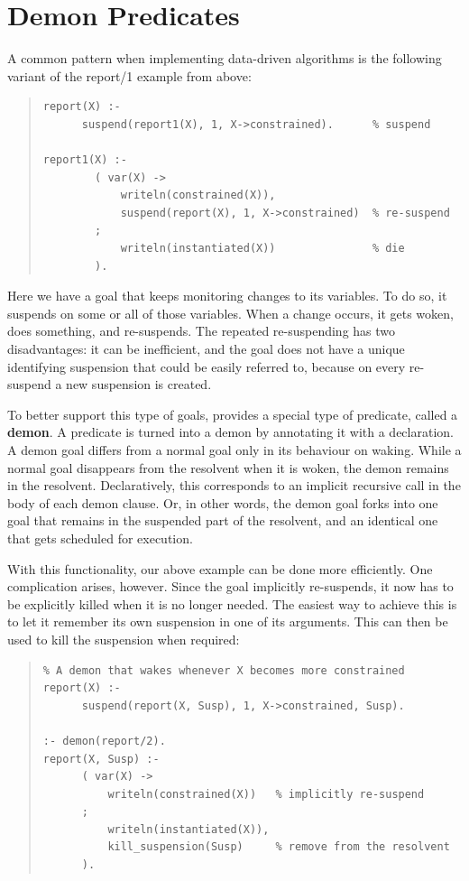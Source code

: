

\section{Demon Predicates}
\label{secdemon}%
A common pattern when implementing data-driven algorithms is the following
variant of the report/1 example from above:
\begin{quote}\begin{verbatim}
report(X) :-
      suspend(report1(X), 1, X->constrained).      % suspend

report1(X) :-
        ( var(X) ->
            writeln(constrained(X)),
            suspend(report(X), 1, X->constrained)  % re-suspend
        ;
            writeln(instantiated(X))               % die
        ).
\end{verbatim}\end{quote}
Here we have a goal that keeps monitoring changes to its variables.
To do so, it suspends on some or all of those variables.
When a change occurs, it gets woken, does something, and re-suspends.
The repeated re-suspending has two disadvantages: it can be inefficient,
and the goal does not have a unique identifying suspension that could be
easily referred to, because on every re-suspend a new suspension is created.

To better support this type of goals, {\eclipse} provides a special type
of predicate, called a {\bf demon}. A predicate is turned into a
demon by annotating it with a
declaration.
A demon goal differs from a normal goal only in its behaviour on
waking. While a normal goal disappears from the resolvent when it is
woken, the demon remains in the resolvent.
Declaratively, this corresponds to an implicit recursive call in
the body of each demon clause.
Or, in other words, the demon goal forks into one goal that remains in the
suspended part of the resolvent, and an identical one
that gets scheduled for execution.

With this functionality, our above example can be done more
efficiently. One complication arises, however. Since the goal
implicitly re-suspends, it now has to be explicitly killed when
it is no longer needed. The easiest way to achieve this is to
let it remember its own suspension in one of its arguments.
This can then be used to kill the suspension when required:
\begin{quote}\begin{verbatim}
% A demon that wakes whenever X becomes more constrained
report(X) :-
      suspend(report(X, Susp), 1, X->constrained, Susp).

:- demon(report/2).
report(X, Susp) :-
      ( var(X) ->
          writeln(constrained(X))   % implicitly re-suspend
      ;
          writeln(instantiated(X)),
          kill_suspension(Susp)     % remove from the resolvent
      ).
\end{verbatim}\end{quote}


